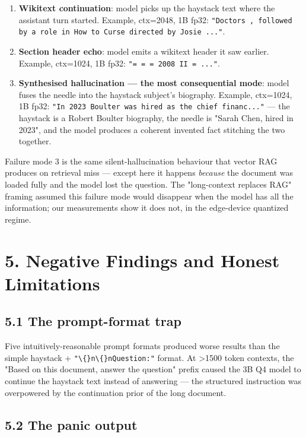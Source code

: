 \documentclass[11pt]{article}
\begin{document}
\begin{enumerate}
\item \textbf{Wikitext continuation}: model picks up the haystack text where the assistant turn started. Example, ctx=2048, 1B fp32: \texttt{"Doctors , followed by a role in How to Curse directed by Josie ..."}.
\item \textbf{Section header echo}: model emits a wikitext header it saw earlier. Example, ctx=1024, 1B fp32: \texttt{"= = = 2008 II = ..."}.
\item \textbf{Synthesised hallucination — the most consequential mode}: model fuses the needle into the haystack subject's biography. Example, ctx=1024, 1B fp32: \texttt{"In 2023 Boulter was hired as the chief financ..."} — the haystack is a Robert Boulter biography, the needle is "Sarah Chen, hired in 2023", and the model produces a coherent invented fact stitching the two together.
\end{enumerate}


Failure mode 3 is the same silent-hallucination behaviour that vector RAG produces on retrieval miss — except here it happens \textit{because} the document was loaded fully and the model lost the question. The "long-context replaces RAG" framing assumed this failure mode would disappear when the model has all the information; our measurements show it does not, in the edge-device quantized regime.


\section*{5. Negative Findings and Honest Limitations}


\subsection*{5.1 The prompt-format trap}


Five intuitively-reasonable prompt formats produced worse results than the simple haystack + \texttt{"\textbackslash\{\}n\textbackslash\{\}nQuestion:"} format. At >1500 token contexts, the "Based on this document, answer the question" prefix caused the 3B Q4 model to continue the haystack text instead of answering — the structured instruction was overpowered by the continuation prior of the long document.


\subsection*{5.2 The panic output}
\end{document}
